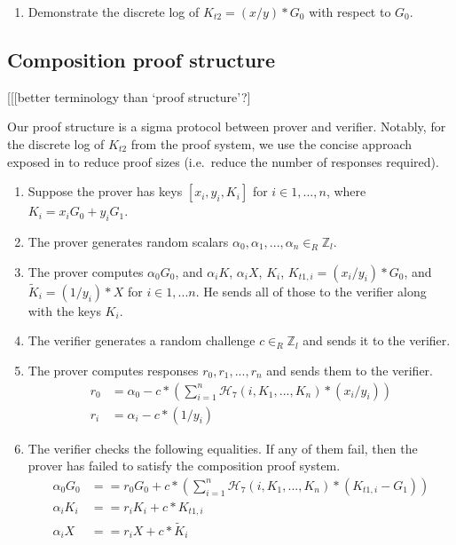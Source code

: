 \begin{appendices}
\begin{enumerate}
    \item Demonstrate the discrete log of $K_{t2} = (x/y)*G_0$ with respect to $G_0$.
\end{enumerate}


\subsection{Composition proof structure}
\label{appendix:composition-proof-structure}

[[[better terminology than `proof structure'?]

Our proof structure is a sigma protocol between prover and verifier. Notably, for the discrete log of $K_{t2}$ from the proof system, we use the concise approach exposed in \cite{clsag-eprint} to reduce proof sizes (i.e.\ reduce the number of responses required).

\begin{enumerate}
    \item Suppose the prover has keys $[x_i, y_i, K_i]$ for $i \in 1,...,n$, where $K_i = x_i G_0 + y_i G_1$.

    \item The prover generates random scalars $\alpha_0, \alpha_1, ..., \alpha_n \in_R \mathbb{Z}_l$.

    \item The prover computes $\alpha_0 G_0$, and $\alpha_i K$, $\alpha_i X$, $K_i$, $K_{t1,i} = (x_i/y_i)*G_0$, and $\tilde{K}_i = (1/y_i)*X$ for $i \in 1,...n$. He sends all of those to the verifier along with the keys $K_i$.

    \item The verifier generates a random challenge $c \in_R \mathbb{Z}_l$ and sends it to the verifier.

    \item The prover computes responses $r_0, r_1, ..., r_n$ and sends them to the verifier.\vspace{.115cm}
    \begin{align*}
        r_0 &= \alpha_0 - c*(\sum^n_{i=1} \mathcal{H}_7(i, K_1,...,K_n)*(x_i/y_i)) \\
        r_i &= \alpha_i - c*(1/y_i)
    \end{align*}

    \item The verifier checks the following equalities. If any of them fail, then the prover has failed to satisfy the composition proof system.\vspace{.115cm}
    \begin{align*}
        \alpha_0 G_0 &== r_0 G_0 + c*(\sum^n_{i=1} \mathcal{H}_7(i, K_1,...,K_n)*(K_{t1,i} - G_1)) \\
        \alpha_i K_i &== r_i K_i + c*K_{t1,i} \\
        \alpha_i X   &== r_i X + c*\tilde{K}_i
    \end{align*}
\end{enumerate}



\end{appendices}
